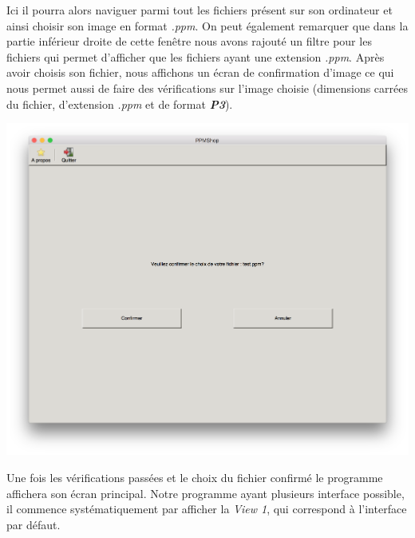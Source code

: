 \documentclass[12pt]{article}
\begin{document}
Ici il pourra alors naviguer parmi tout les fichiers présent sur son ordinateur et ainsi choisir son image en format \textit{.ppm}. On peut également remarquer que dans la partie inférieur droite de cette fenêtre nous avons rajouté un filtre pour les fichiers qui permet d'afficher que les fichiers ayant une extension \textit{.ppm}.
Après avoir choisis son fichier, nous affichons un écran de confirmation d'image ce qui nous permet aussi de faire des vérifications sur l'image choisie (dimensions carrées du fichier, d'extension \textit{.ppm} et de format \textit{\textbf{P3}}).

\begin{center}
\includegraphics[scale = 0.4]{confirmationScreen}\\
\end{center}

Une fois les vérifications passées et le choix du fichier confirmé le programme affichera son écran principal. Notre programme ayant plusieurs interface possible, il commence systématiquement par afficher la \textit{View 1}, qui correspond à l'interface par défaut.
\end{document}
